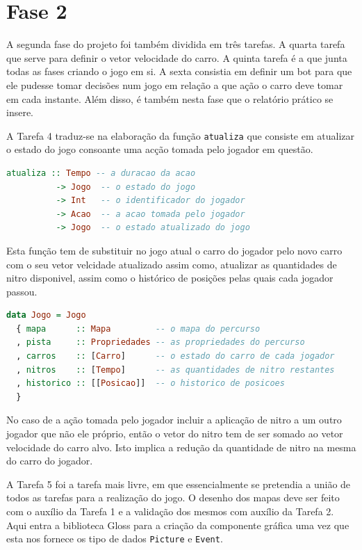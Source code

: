 \documentclass[a4paper]{report}
\begin{document}
\section{Fase 2}
\label{sec:analisefase2}

A segunda fase do projeto foi também dividida em três tarefas. A quarta tarefa
que serve para definir o vetor velocidade do carro. A quinta tarefa é a que
junta todas as fases criando o jogo em si. A sexta consistia em definir um bot
para que ele pudesse tomar decisões num jogo em relação a que ação o carro deve
tomar em cada instante. Além disso, é também nesta fase que o relatório prático
se insere.

A Tarefa 4 traduz-se na elaboração da função \texttt{atualiza} que consiste em
atualizar o estado do jogo consoante uma acção tomada pelo jogador em questão.

\begin{lstlisting}[language=Haskell]
 atualiza :: Tempo -- a duracao da acao
          -> Jogo  -- o estado do jogo
          -> Int   -- o identificador do jogador
          -> Acao  -- a acao tomada pelo jogador
          -> Jogo  -- o estado atualizado do jogo
\end{lstlisting}

Esta função tem de substituir no jogo atual o carro do jogador pelo novo carro
com o seu vetor velcidade atualizado assim como, atualizar as quantidades de
nitro disponivel, assim como o histórico de posições pelas quais cada jogador
passou.

\begin{lstlisting}[language=Haskell]
 data Jogo = Jogo
  { mapa      :: Mapa         -- o mapa do percurso
  , pista     :: Propriedades -- as propriedades do percurso
  , carros    :: [Carro]      -- o estado do carro de cada jogador
  , nitros    :: [Tempo]      -- as quantidades de nitro restantes
  , historico :: [[Posicao]]  -- o historico de posicoes
  }
\end{lstlisting}

No caso de a ação tomada pelo jogador incluir a aplicação de nitro a um outro
jogador que não ele próprio, então o vetor do nitro tem de ser somado ao vetor
velocidade do carro alvo. Isto implica a redução da quantidade de nitro na mesma
do carro do jogador.

A Tarefa 5 foi a tarefa mais livre, em que essencialmente se pretendia a união
de todos as tarefas para a realização do jogo. O desenho dos mapas deve ser
feito com o auxílio da Tarefa 1 e a validação dos mesmos com auxílio da Tarefa 2.
Aqui entra a biblioteca Gloss para a criação da componente gráfica uma vez que
esta nos fornece os tipo de dados \texttt{Picture} e \texttt{Event}.
\end{document}
